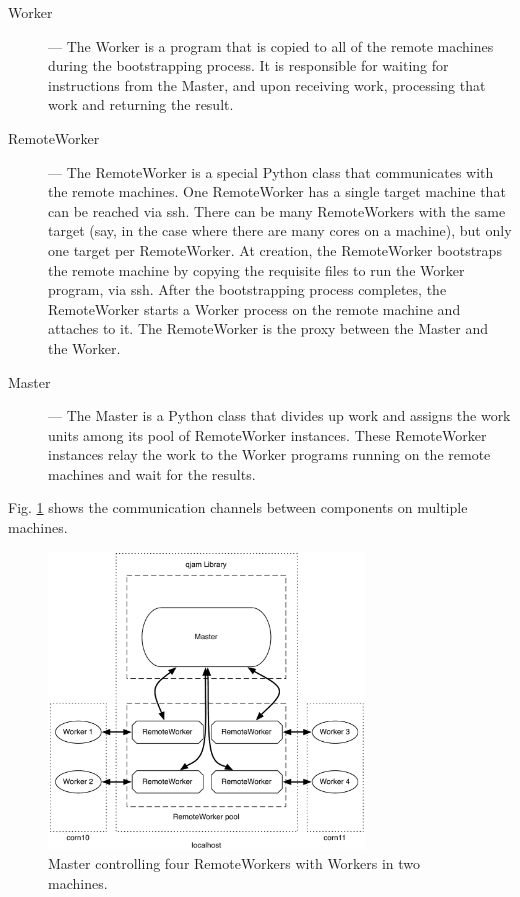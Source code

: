 \documentclass[%
  final,
  notitlepage,
  narroweqnarray,
  inline,
]{ieee}
\begin{document}
\begin{description}
  \item[Worker] --- The Worker is a program that is copied to all of the remote
    machines during the bootstrapping process. It is responsible for waiting
    for instructions from the Master, and upon receiving work, processing that
    work and returning the result. \\

  \item[RemoteWorker] --- The RemoteWorker is a special Python class that
    communicates with the remote machines. One RemoteWorker has a single target
    machine that can be reached via ssh. There can be many RemoteWorkers with
    the same target (say, in the case where there are many cores on a machine),
    but only one target per RemoteWorker. At creation, the RemoteWorker
    bootstraps the remote machine by copying the requisite files to run the
    Worker program, via ssh. After the bootstrapping process completes, the
    RemoteWorker starts a Worker process on the remote machine and attaches to
    it. The RemoteWorker is the proxy between the Master and the Worker. \\

  \item[Master] --- The Master is a Python class that divides up work and
    assigns the work units among its pool of RemoteWorker instances. These
    RemoteWorker instances relay the work to the Worker programs running on the
    remote machines and wait for the results. \\
\end{description}

Fig. \ref{diagram} shows the communication channels between components on
multiple machines.

\begin{figure}[h!]
  \begin{center}
    \includegraphics[width=3.3in]{fwk_diagram/fwk_diagram.pdf}
  \end{center}
  \caption{Master controlling four RemoteWorkers with Workers in two machines.}
  \label{diagram}
\end{figure}
\end{document}
